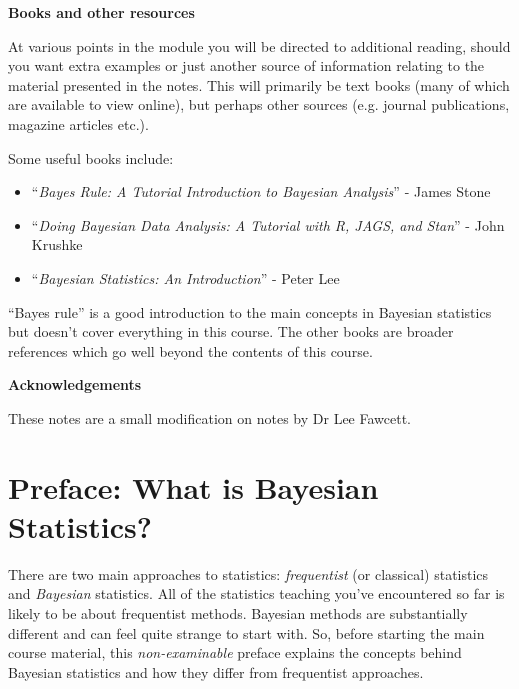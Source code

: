 \clearpage
\noindent \textbf{\color{verydarkred}Books and other resources}

At various points in the module you will be directed to additional reading, should you want extra examples or just another source of information relating to the material presented in the notes.  This will primarily be text books (many of which are available to view online), but perhaps other sources (e.g. journal publications, magazine articles etc.).  

\noindent Some useful books include:
\begin{itemize}
\item ``\textit{Bayes Rule: A Tutorial Introduction to Bayesian Analysis}'' - James Stone
\item ``\textit{Doing Bayesian Data Analysis: A Tutorial with R, JAGS, and Stan}'' - John Krushke
\item ``\textit{Bayesian Statistics: An Introduction}'' - Peter Lee
\end{itemize}
``Bayes rule'' is a good introduction to the main concepts in Bayesian statistics but doesn't cover everything in this course.
The other books are broader references which go well beyond the contents of this course.

\noindent \textbf{\color{verydarkred}Acknowledgements}

These notes are a small modification on notes by Dr Lee Fawcett.
\newpage

\chapter*{Preface: What is Bayesian Statistics?}

There are two main approaches to statistics: \emph{frequentist} (or classical) statistics and \emph{Bayesian} statistics.
All of the statistics teaching you've encountered so far is likely to be about frequentist methods.
Bayesian methods are substantially different and can feel quite strange to start with.
So, before starting the main course material, this \emph{non-examinable} preface explains the concepts behind Bayesian statistics and how they differ from frequentist approaches.

